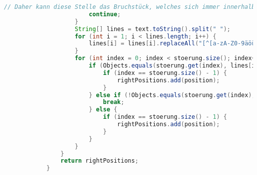\documentclass[a4paper, 10pt, ngerman]{scrartcl}
\begin{document}
\begin{lstlisting}[frame=single, language=Java, title=Methode checkPositions, breaklines=true, label=lst:checkPosition]
                 		// Daher kann diese Stelle das Bruchstück, welches sich immer innerhalb eines Satzes befindet, nicht vervollständigen.
                		continue;
           			}
            		String[] lines = text.toString().split(" ");
            		for (int i = 1; i < lines.length; i++) {
                		lines[i] = lines[i].replaceAll("[^[a-zA-Z0-9äöüß]]", "");
            		}
            		for (int index = 0; index < stoerung.size(); index++) {
                		if (Objects.equals(stoerung.get(index), lines[index])) {
                    		if (index == stoerung.size() - 1) {
                        		rightPositions.add(position);
                    		}
               			} else if (!Objects.equals(stoerung.get(index), "_")) {
                    		break;
                		} else {
                    		if (index == stoerung.size() - 1) {
                        		rightPositions.add(position);
                    		}
                		}
            		}
        		}
        		return rightPositions;
    		}
		\end{lstlisting}
   
\end{document}

